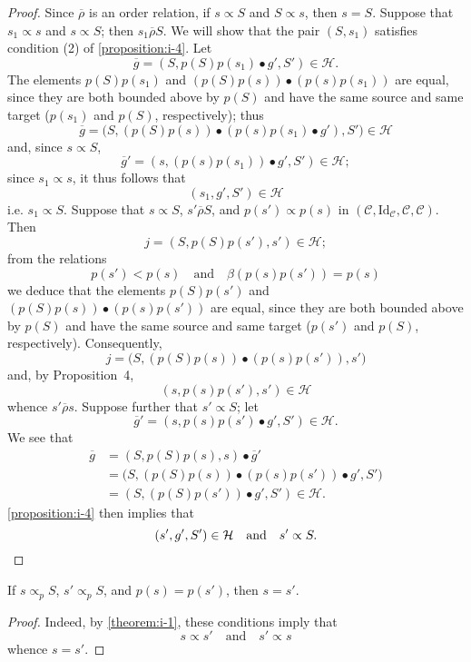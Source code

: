 \documentclass[a4paper,fleqn]{article}
\theoremstyle{plain}
\newenvironment{corollary}[1]
  {\renewcommand\theinnercorollary{#1}\innercorollary}
  {\endinnercorollary}
\theoremstyle{definition}
\newcommand{\oldpage}[1]{{\marginpar{\footnotesize$\bigg\vert$\,\,\,\,\textit{p.~#1}}}}
\newcommand{\textand}{\quad\text{and}\quad}
\newcommand{\CC}{\mathcal{C}}
\newcommand{\HH}{\mathcal{H}}
\newcommand{\relrhobar}{\mathrel{\overline{\rho}}}
\newcommand{\subs}{\mathrel{\propto}}
\newcommand{\Id}{\mathrm{Id}}
\begin{document}
\begin{proof}
  Since $\relrhobar$ is an order relation, if $s\subs S$ and $S\subs s$, then $s=S$.
  Suppose that $s_1\subs s$ and $s\subs S$;
  then $s_1\relrhobar S$.
  We will show that the pair $(S,s_1)$ satisfies condition (2\textquotesingle) of \cref{proposition:i-4}.
  Let
  \[
    \overline{g}
    = (S,p(S)p(s_1)\bullet g',S')
    \in\HH.
  \]
  The elements $p(S)p(s_1)$ and $(p(S)p(s))\bullet(p(s)p(s_1))$ are equal, since they are both bounded above by $p(S)$ and have the same source and same target ($p(s_1)$ and $p(S)$, respectively);
  thus
  \[
    \overline{g}
    = \big(S,(p(S)p(s))\bullet(p(s)p(s_1)\bullet g'),S'\big)
    \in\HH
  \]
  and, since $s\subs S$,
  \[
    \overline{g}'
    = (s,(p(s)p(s_1))\bullet g', S')
    \in\HH;
  \]
  since $s_1\subs s$, it thus follows that
  \[
    (s_1,g',S')
    \in\HH
  \]
  i.e. $s_1\subs S$.
  Suppose that $s\subs S$, $s'\relrhobar S$, and $p(s')\subs p(s)$ in $(\CC,\Id_\CC,\CC,\CC)$.
  Then
  \[
    j
    = (S,p(S)p(s'),s')
    \in\HH;
  \]
  from the relations
  \[
    p(s') < p(s)
    \textand
    \beta(p(s)p(s')) = p(s)
  \]
  we deduce that the elements $p(S)p(s')$ and $(p(S)p(s))\bullet(p(s)p(s'))$ are equal, since they are both bounded above by $p(S)$ and have the same source and same target ($p(s')$ and $p(S)$, respectively).
  Consequently,
  \[
    j
    = \big(S,(p(S)p(s))\bullet(p(s)p(s')),s'\big)
  \]
  and, by Proposition~4,
  \[
    (s,p(s)p(s'),s')
    \in\HH
  \]
  whence $s'\relrhobar s$.
  Suppose further that $s'\subs S$;
  let
  \[
    \overline{g}'
    = (s,p(s)p(s')\bullet g',S')
    \in\HH.
  \]
  We see that
  \[
    \begin{aligned}
      \overline{g}
      &= (S,p(S)p(s),s)\bullet\overline{g}'
    \\&= \big(S,(p(S)p(s))\bullet(p(s)p(s'))\bullet g',S'\big)
    \\&= (S,(p(S)p(s'))\bullet g',S')
    \in\HH.
    \end{aligned}
  \]
  \oldpage{363}
  \cref{proposition:i-4} then implies that
  \[
    (s',g',S')\in\HH
    \textand
    s'\subs S.
    \qedhere
  \]
\end{proof}

\begin{corollary}{1}
  If $s\subs_p S$, $s'\subs_p S$, and $p(s)=p(s')$, then $s=s'$.
\end{corollary}

\begin{proof}
  Indeed, by \cref{theorem:i-1}, these conditions imply that
  \[
    s\subs s'
    \textand
    s'\subs s
  \]
  whence $s=s'$.
\end{proof}
\end{document}
